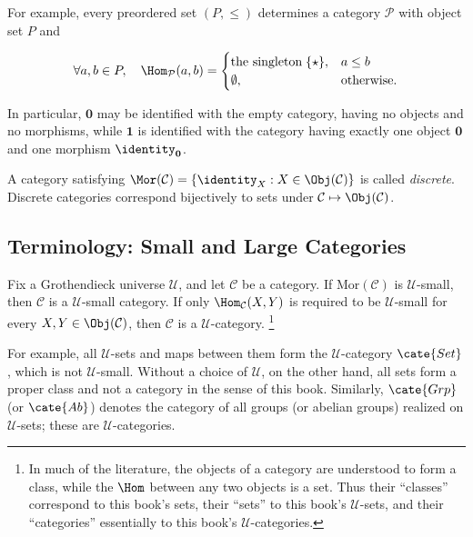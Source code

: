 For example, every preordered set $(P,\leq)$ determines a category $\mathcal P$ with object set $P$ and

\[ \forall a,b \in P, \quad \Hom_{\mathcal{P}}(a, b) = \begin{cases}
	\text{the singleton} \; \{ \star \}, & a \leq b \\
	\emptyset, & \text{otherwise.}
\end{cases}\]

In particular, $\mathbf0$ may be identified with the empty category, having no objects and no morphisms, while $\mathbf1$ is identified with the category having exactly one object $\mathbf0$ and one morphism $\identity_{\mathbf0}$.

A category satisfying $\Mor(\mathcal C)=\{\identity_X:X\in\Obj(\mathcal C)\}$ is called \emph{discrete}. Discrete categories correspond bijectively to sets under $\mathcal C\mapsto\Obj(\mathcal C)$.

\subsection*{Terminology: Small and Large Categories}

Fix a Grothendieck universe $\mathcal U$, and let $\mathcal C$ be a category. If $\mathrm{Mor}(\mathcal C)$ is $\mathcal U$-small, then $\mathcal C$ is a $\mathcal U$-small category. If only $\Hom_{\mathcal C}(X,Y)$ is required to be $\mathcal U$-small for every $X,Y\in\Obj(\mathcal C)$, then $\mathcal C$ is a $\mathcal U$-category.
\footnote{In much of the literature, the objects of a category are understood to form a class, while the $\Hom$ between any two objects is a set. Thus their ``classes'' correspond to this book's sets, their ``sets'' to this book's $\mathcal U$-sets, and their ``categories'' essentially to this book's $\mathcal U$-categories.}

For example, all $\mathcal U$-sets and maps between them form the $\mathcal U$-category $\cate{Set}$, which is not $\mathcal U$-small. Without a choice of $\mathcal U$, on the other hand, all sets form a proper class and not a category in the sense of this book. Similarly, $\cate{Grp}$ (or $\cate{Ab}$) denotes the category of all groups (or abelian groups) realized on $\mathcal U$-sets; these are $\mathcal U$-categories.

